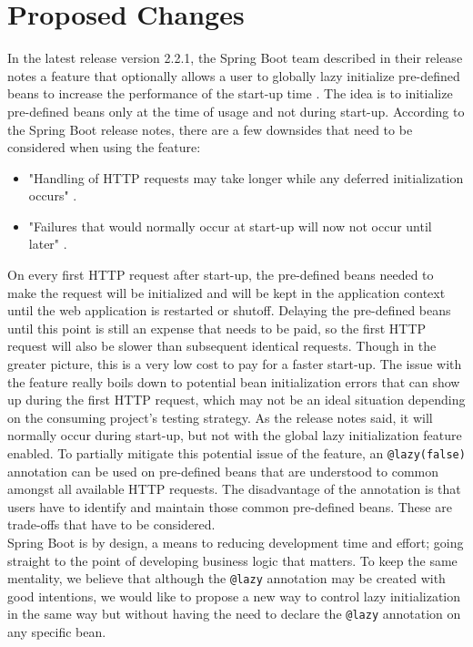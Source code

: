 \section{Proposed Changes}

In the latest release version 2.2.1, the Spring Boot team described in their release notes a feature that optionally allows a user to globally lazy initialize pre-defined beans to increase the performance of the start-up time \cite{springBootReleaseNote}. The idea is to initialize pre-defined beans only at the time of usage and not during start-up. According to the Spring Boot release notes, there are a few downsides that need to be considered when using the feature:

\begin{itemize}
\item "Handling of HTTP requests may take longer while any deferred initialization occurs" \cite{springBootReleaseNote}.
\item "Failures that would normally occur at start-up will now not occur until later" \cite{springBootReleaseNote}.
\end{itemize}

On every first HTTP request after start-up, the pre-defined beans needed to make the request will be initialized and will be kept in the application context until the web application is restarted or shutoff. Delaying the pre-defined beans until this point is still an expense that needs to be paid, so the first HTTP request will also be slower than subsequent identical requests. Though in the greater picture, this is a very low cost to pay for a faster start-up. The issue with the feature really boils down to potential bean initialization errors that can show up during the first HTTP request, which may not be an ideal situation depending on the consuming project's testing strategy. As the release notes said, it will normally occur during start-up, but not with the global lazy initialization feature enabled. To partially mitigate this potential issue of the feature, an \texttt{@lazy(false)} annotation can be used on pre-defined beans that are understood to common amongst all available HTTP requests. The disadvantage of the annotation is that users have to identify and maintain those common pre-defined beans. These are trade-offs that have to be considered.\\

Spring Boot is by design, a means to reducing development time and effort; going straight to the point of developing business logic that matters. To keep the same mentality, we believe that although the \texttt{@lazy} annotation may be created with good intentions, we would like to propose a new way to control lazy initialization in the same way but without having the need to declare the \texttt{@lazy} annotation on any specific bean.\\

